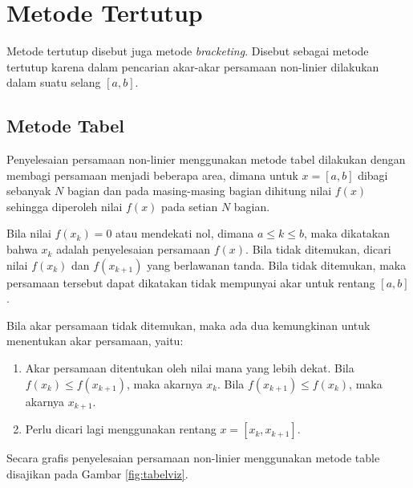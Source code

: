 \documentclass[
]{book}
\providecommand{\tightlist}{%
  \setlength{\itemsep}{0pt}\setlength{\parskip}{0pt}}
\theoremstyle{definition}
\theoremstyle{definition}
\theoremstyle{definition}
\theoremstyle{definition}
\theoremstyle{remark}
\begin{document}
\hypertarget{bracketing}{%
\section{Metode Tertutup}\label{bracketing}}

Metode tertutup disebut juga metode \emph{bracketing}. Disebut sebagai metode tertutup karena dalam pencarian akar-akar persamaan non-linier dilakukan dalam suatu selang \(\left[a,b \right]\).

\hypertarget{table}{%
\subsection{Metode Tabel}\label{table}}

Penyelesaian persamaan non-linier menggunakan metode tabel dilakukan dengan membagi persamaan menjadi beberapa area, dimana untuk \(x=\left[a,b \right]\) dibagi sebanyak \(N\) bagian dan pada masing-masing bagian dihitung nilai \(f\left(x \right)\) sehingga diperoleh nilai \(f\left(x \right)\) pada setian \(N\) bagian.

Bila nilai \(f\left(x_k \right)=0\) atau mendekati nol, dimana \(a \le k \le b\), maka dikatakan bahwa \(x_k\) adalah penyelesaian persamaan \(f\left(x \right)\). Bila tidak ditemukan, dicari nilai \(f\left(x_k \right)\) dan \(f\left(x_{k+1} \right)\) yang berlawanan tanda. Bila tidak ditemukan, maka persamaan tersebut dapat dikatakan tidak mempunyai akar untuk rentang \(\left[a,b \right]\).

Bila akar persamaan tidak ditemukan, maka ada dua kemungkinan untuk menentukan akar persamaan, yaitu:

\begin{enumerate}
\def\labelenumi{\alph{enumi}.}
\tightlist
\item
  Akar persamaan ditentukan oleh nilai mana yang lebih dekat. Bila \(f\left(x_k\right)\le f\left(x_{k+1}\right)\), maka akarnya \(x_k\). Bila \(f\left(x_{k+1}\right)\le f\left(x_{k}\right)\), maka akarnya \(x_{k+1}\).
\item
  Perlu dicari lagi menggunakan rentang \(x=\left[x_{k}, x_{k+1} \right]\).
\end{enumerate}

Secara grafis penyelesaian persamaan non-linier menggunakan metode table disajikan pada Gambar \ref{fig:tabelviz}.
\end{document}
